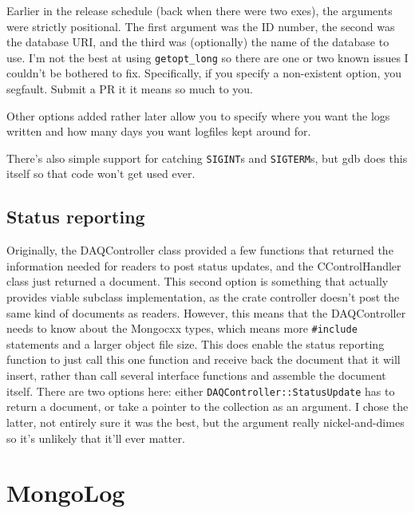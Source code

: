 Earlier in the release schedule (back when there were two exes), the arguments were strictly positional.
The first argument was the ID number, the second was the database URI, and the third was (optionally) the name of the database to use.
I'm not the best at using \texttt{getopt\_long} so there are one or two known issues I couldn't be bothered to fix.
Specifically, if you specify a non-existent option, you segfault.
Submit a PR it it means so much to you.

Other options added rather later allow you to specify where you want the logs written and how many days you want logfiles kept around for.

There's also simple support for catching \texttt{SIGINT}s and \texttt{SIGTERM}s, but gdb does this itself so that code won't get used ever.

\subsection{Status reporting}

Originally, the DAQController class provided a few functions that returned the information needed for readers to post status updates, and the CControlHandler class just returned a document.
This second option is something that actually provides viable subclass implementation, as the crate controller doesn't post the same kind of documents as readers.
However, this means that the DAQController needs to know about the Mongocxx types, which means more \texttt{\#include} statements and a larger object file size.
This does enable the status reporting function to just call this one function and receive back the document that it will insert, rather than call several interface functions and assemble the document itself.
There are two options here: either \texttt{DAQController::StatusUpdate} has to return a document, or take a pointer to the collection as an argument.
I chose the latter, not entirely sure it was the best, but the argument really nickel-and-dimes so it's unlikely that it'll ever matter.

\section{MongoLog}

